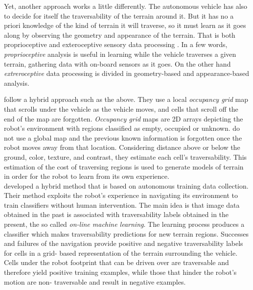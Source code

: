 \documentclass[12pt,a4paper,table,dvipsnames,tikz]{report}
\newcommand{\term}{\textit}
\newcommand{\acronym}{\MakeUppercase}
\begin{document}
	Yet, another approach works a little differently. The autonomous 
	vehicle has also to decide for itself the traversability of the terrain 
	around it. But it has no a priori knowledge of the kind of terrain it will 
	traverse, so it must learn as it goes along by observing the geometry and 
	appearance of the terrain. That is both proprioceptive and exteroceptive sensory 
	data processing \citep{Papadakis}. In a few words, \term{proprioceptive} analysis 
	is useful in learning while the vehicle traverses a given terrain, gathering data 
	with on-board sensors as it goes. On the other hand \term{extreroceptive} data 
	processing is divided in geometry-based and appearance-based analysis. 
	\par
	\citet{Shneier} follow a hybrid approach such as the above. They use a local 
	\term{occupancy grid} map that scrolls under the vehicle as the vehicle moves,
	and cells that scroll off the end of the map are forgotten. 
	\term{Occupancy grid} maps \citep{Moravec} are \acronym{2d} arrays depicting the 
	robot’s environment with regions classified as empty, occupied or unknown.
	\citet{Shneier} do not 
	use a global map and the previous known information is forgotten once the robot 
	moves away from that location. Considering distance above or below the ground, 
	color, texture, and contrast, they estimate each cell’s traversability. 
	This estimation of the cost of traversing regions is used to generate models of 
	terrain in order for the robot to learn from its own experience.
	\\
	
	\citet{Kim} developed a hybrid method that is based on autonomous training data 
	collection. Their method
	exploits the robot’s experience in navigating its environment to train 
	classifiers without human intervention. The main idea is that image 
	data obtained in the past is associated with traversability labels 
	obtained in the present, the so called \term{on-line machine learning}. The 
	learning process produces a classifier which makes traversability 
	predictions for new terrain regions. Successes and failures of the navigation 
	provide positive and negative traversability labels for cells in a grid-
	based representation of the terrain surrounding the vehicle. Cells under the 
	robot footprint that can be driven over are traversable and therefore yield 
	positive training examples, while those that hinder the robot’s motion are non-
	traversable and result in negative examples.
	\\
	
\end{document}
